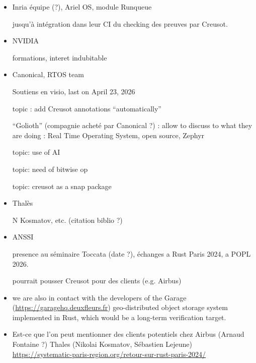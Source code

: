 \documentclass[a4paper,11pt]{article}
\begin{document}
\begin{itemize}
\item Inria équipe (?), Ariel OS, module Runqueue

   jusqu'à intégration dans leur CI du checking des preuves par Creusot.

\item NVIDIA

  formations, interet indubitable


\item Canonical, RTOS team

  Soutiens en visio, last on April 23, 2026

  topic : add Creusot annotations ``automatically''

  ``Golioth'' (compagnie acheté par Canonical ?) : allow to discuss to what they
  are doing : Real Time Operating System, open source, Zephyr

  topic: use of AI

  topic: need of bitwise op

  topic: creusot as a snap package

\item Thalès

  N Kosmatov, etc.  (citation biblio ?)

\item ANSSI

  presence au séminaire Toccata (date ?), échanges a Rust Paris 2024, a POPL 2026.

  pourrait pousser Creusot pour des clients (e.g. Airbus)

\item we are also in contact with the developers of the Garage
  (\url{https://garagehq.deuxfleurs.fr}) geo-distributed object storage system
  implemented in Rust, which would be a long-term verification target.


\item Est-ce que l'on peut mentionner des clients potentiels chez Airbus (Arnaud
  Fontaine ?)  Thales (Nikolai Kosmatov, Sébastien Lejeune)
  \url{https://systematic-paris-region.org/retour-sur-rust-paris-2024/}







\end{itemize}
\end{document}
